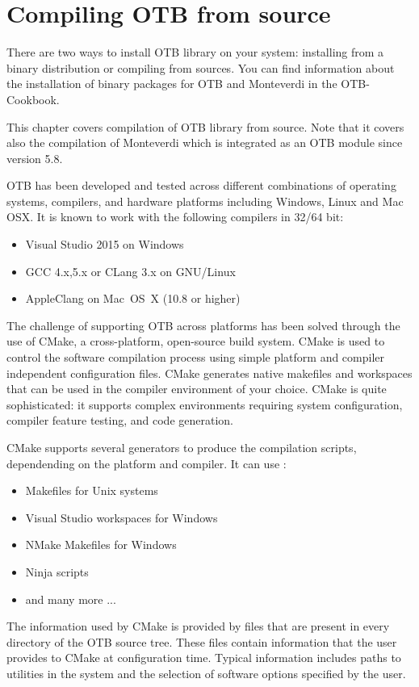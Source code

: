 \setcounter{secnumdepth}{3}

\chapter{Compiling OTB from source}
\label{chapter:Installation}

There are two ways to install OTB library on your system: installing from a binary distribution or compiling from sources. 
You can find information about the installation of binary packages for OTB and Monteverdi in the OTB-Cookbook.

This chapter covers compilation of OTB library from source. Note that it covers
also the compilation of Monteverdi which is integrated as an OTB module since
version 5.8.

OTB has been developed and tested across different combinations of operating
systems, compilers, and hardware platforms including Windows, Linux and Mac OSX.
It is known to work with the following compilers in 32/64 bit:
\begin{itemize}
\item Visual Studio 2015 on Windows
\item GCC 4.x,5.x or CLang 3.x on GNU/Linux
\item AppleClang on Mac~OS~X (10.8 or higher)
\end{itemize}

The challenge of supporting OTB across platforms has been solved through the use of CMake, a cross-platform, open-source
build system. CMake is used to control the software compilation process using simple platform and compiler independent
configuration files.  CMake generates native makefiles and workspaces that can be used in the compiler environment of
your choice. CMake is quite sophisticated: it supports complex environments requiring system configuration, compiler
feature testing, and code generation.

CMake supports several generators to produce the compilation scripts, dependending on the platform and compiler. It can use :
\begin{itemize}
\item Makefiles for Unix systems
\item Visual Studio workspaces for Windows
\item NMake Makefiles for Windows
\item Ninja scripts
\item and many more ...
\end{itemize}
The information used by CMake is provided by  files that
are present in every directory of the OTB source tree. These files contain information that the user provides to CMake
at configuration time. Typical information includes paths to utilities in the system and the selection of software
options specified by the user.

